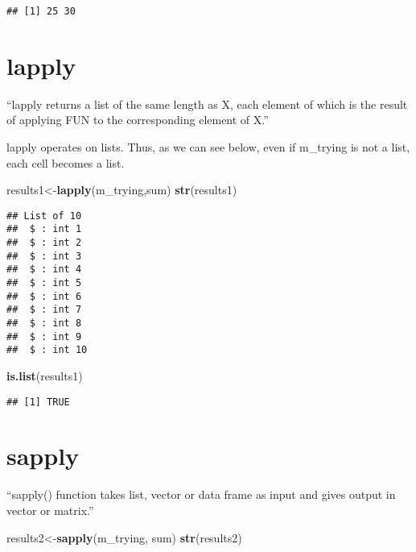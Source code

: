 \documentclass[]{book}
\newenvironment{Shaded}{\begin{snugshade}}{\end{snugshade}}
\newcommand{\KeywordTok}[1]{\textcolor[rgb]{0.13,0.29,0.53}{\textbf{#1}}}
\newcommand{\NormalTok}[1]{#1}
\begin{document}
\begin{verbatim}
## [1] 25 30
\end{verbatim}

\section{lapply}\label{lapply}

``lapply returns a list of the same length as X, each element of which
is the result of applying FUN to the corresponding element of X.''

lapply operates on lists. Thus, as we can see below, even if m\_trying
is not a list, each cell becomes a list.

\begin{Shaded}
\begin{Highlighting}[]
\NormalTok{results1<-}\KeywordTok{lapply}\NormalTok{(m_trying,sum)}
\KeywordTok{str}\NormalTok{(results1)}
\end{Highlighting}
\end{Shaded}

\begin{verbatim}
## List of 10
##  $ : int 1
##  $ : int 2
##  $ : int 3
##  $ : int 4
##  $ : int 5
##  $ : int 6
##  $ : int 7
##  $ : int 8
##  $ : int 9
##  $ : int 10
\end{verbatim}

\begin{Shaded}
\begin{Highlighting}[]
\KeywordTok{is.list}\NormalTok{(results1)}
\end{Highlighting}
\end{Shaded}

\begin{verbatim}
## [1] TRUE
\end{verbatim}

\section{sapply}\label{sapply}

``sapply() function takes list, vector or data frame as input and gives
output in vector or matrix.''

\begin{Shaded}
\begin{Highlighting}[]
\NormalTok{results2<-}\KeywordTok{sapply}\NormalTok{(m_trying, sum)}
\KeywordTok{str}\NormalTok{(results2)}
\end{Highlighting}
\end{Shaded}
\end{document}
